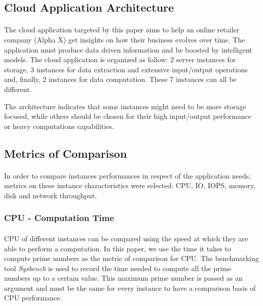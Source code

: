 \documentclass[11pt]{article}
\begin{document}
	\subsection{Cloud Application Architecture}
		\paragraph{} The cloud application targeted by this paper aims to help
		an online retailer company (Alpha X) get insights on how their business
		evolves over time. The application must produce data driven information
		and be boosted by intelligent models. The cloud application is organized
		as follow: 2 server instances for storage, 3 instances for data
		extraction and extensive input/output operations and, finally, 2
		instances for data computation. These 7 instances can all be different.
		\cite{2}\bigskip

		The architecture indicates that some instances might need to be more
		storage focused, while others should be chosen for their high
		input/output performance or heavy computations capabilities.
	\subsection{Metrics of Comparison}
		\paragraph{} In order to compare instances performances in respect of
		the application needs, metrics on these instance characteristics were
		selected: CPU, IO, IOPS, memory, disk and network throughput.
		
		\subsubsection{CPU - Computation Time}
			\paragraph{} CPU of different instances can be compared using the speed at which they
			are able to perform a computation. In this paper, we use the time it
			takes to compute prime numbers as the metric of comparison for CPU.
			The benchmarking tool \emph{Sysbench} is used to record the time needed to
			compute all the prime numbers up to a certain value. This maximum prime
			number is passed as an argument and must be the same for every instance
			to have a comparison basis of CPU performance. \cite{3}
\end{document}
